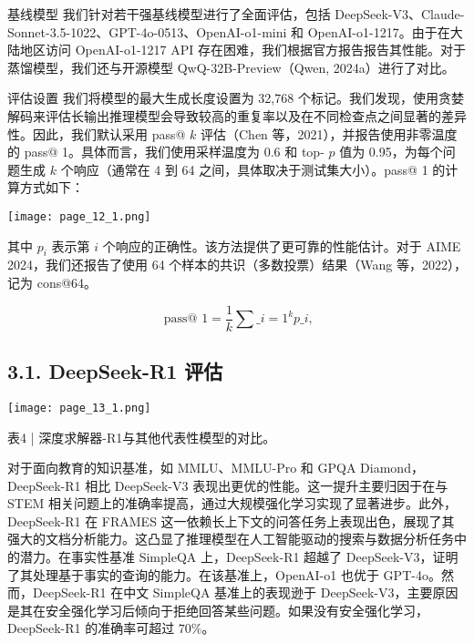\documentclass[12pt,a4paper]{report} %
\begin{document}
基线模型 我们针对若干强基线模型进行了全面评估，包括 DeepSeek-V3、Claude-Sonnet-3.5-1022、GPT-4o-0513、OpenAI-o1-mini 和 OpenAI-o1-1217。由于在大陆地区访问 OpenAI-o1-1217 API 存在困难，我们根据官方报告报告其性能。对于蒸馏模型，我们还与开源模型 QwQ-32B-Preview（Qwen, 2024a）进行了对比。


评估设置 我们将模型的最大生成长度设置为 32,768 个标记。我们发现，使用贪婪解码来评估长输出推理模型会导致较高的重复率以及在不同检查点之间显著的差异性。因此，我们默认采用 pass@ $k$ 评估（Chen 等，2021），并报告使用非零温度的 pass@ 1。具体而言，我们使用采样温度为 0.6 和 top- $p$ 值为 0.95，为每个问题生成 $k$ 个响应（通常在 4 到 64 之间，具体取决于测试集大小）。pass@ 1 的计算方式如下：\begin{center}
\texttt{[image: page\_12\_1.png]}
\end{center}
\begin{center}
其中 $p_{i}$ 表示第 $i$ 个响应的正确性。该方法提供了更可靠的性能估计。对于 AIME 2024，我们还报告了使用 64 个样本的共识（多数投票）结果（Wang 等，2022），记为 cons@64。
\end{center}
$$\text { pass@ } 1=\frac{1}{k} \sum\_{i=1}^{k} p\_{i},$$ 
\subsection*{3.1. DeepSeek-R1 评估}


\begin{center}
\texttt{[image: page\_13\_1.png]}
\end{center}
\begin{center}
表4 | 深度求解器-R1与其他代表性模型的对比。
\end{center}






对于面向教育的知识基准，如 MMLU、MMLU-Pro 和 GPQA Diamond，DeepSeek-R1 相比 DeepSeek-V3 表现出更优的性能。这一提升主要归因于在与 STEM 相关问题上的准确率提高，通过大规模强化学习实现了显著进步。此外，DeepSeek-R1 在 FRAMES 这一依赖长上下文的问答任务上表现出色，展现了其强大的文档分析能力。这凸显了推理模型在人工智能驱动的搜索与数据分析任务中的潜力。在事实性基准 SimpleQA 上，DeepSeek-R1 超越了 DeepSeek-V3，证明了其处理基于事实的查询的能力。在该基准上，OpenAI-o1 也优于 GPT-4o。然而，DeepSeek-R1 在中文 SimpleQA 基准上的表现逊于 DeepSeek-V3，主要原因是其在安全强化学习后倾向于拒绝回答某些问题。如果没有安全强化学习，DeepSeek-R1 的准确率可超过 $70 \%$。
\end{document}
